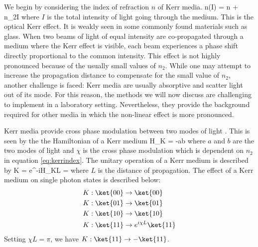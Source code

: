 We begin by considering the index of refraction $n$ of Kerr media.
\beq
\label{eq:kerrindex}
n(I) = n + n_2I
\eeq
where $I$ is the total intensity of light going through the medium. This is the optical Kerr effect. It is weakly seen in some commonly found materials such as glass. When two beams of light of equal intensity are co-propagated through a medium where the Kerr effect is visible, each beam experiences a phase shift directly proportional to the common intensity. This effect is not highly pronounced because of the usually small values of $n_2$. While one may attempt to increase the propagation distance to compensate for the small value of $n_2$, another challenge is faced: Kerr media are usually absorptive and scatter light out of its mode. For this reason, the methods we will now discuss are challenging to implement in a laboratory setting. Nevertheless, they provide the background required for other media in which the non-linear effect  is more pronounced.

Kerr media provide cross phase modulation between two modes of light \cite{nielsen2000}. This is seen by the the Hamiltonian of a Kerr medium
\beq
H_K = -\chi{}ab
\eeq
where $a$ and $b$ are the two modes of light and $\chi$ is the cross phase modulation which is dependent on $n_2$ in equation \eqref{eq:kerrindex}. The unitary operation of a Kerr medium is described by
\beq
K = e^{-iH_KL} = 
\eeq
where $L$ is the distance of propagation. The effect of a Kerr medium on single photon states is described below:
\begin{align}
K:\ket{00}&\rightarrow\ket{00}\\
K:\ket{01}&\rightarrow\ket{01}\\
K:\ket{10}&\rightarrow\ket{10}\\
K:\ket{11}&\rightarrow e^{i\chi L}\ket{11}
\end{align}
Setting $\chi L = \pi$, we have $K:\ket{11}\rightarrow -\ket{11}$. 


